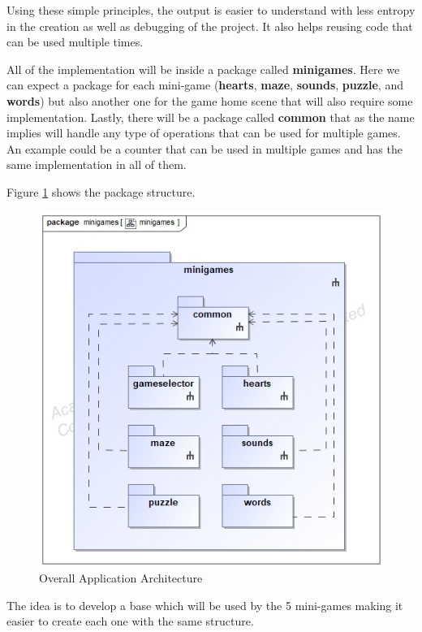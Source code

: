 Using these simple principles, the output is easier to understand with less entropy in the creation as well as debugging of the project. It also helps reusing code that can be used multiple times.

All of the implementation will be inside a package called \textbf{minigames}. Here we can expect a package for each mini-game (\textbf{hearts}, \textbf{maze}, \textbf{sounds}, \textbf{puzzle}, and \textbf{words}) but also another one for the game home scene that will also require some implementation. Lastly, there will be a package called \textbf{common} that as the name implies will handle any type of operations that can be used for multiple games. An example could be a counter that can be used in multiple games and has the same implementation in all of them.


\newpage
Figure \ref{fig:packages} shows the package structure.

\begin{figure}[H]
    \centering
    \includegraphics[scale=.5]{Chapters/arq/class__minigames__minigames.jpg}
    \caption{Overall Application Architecture}
    \label{fig:packages}
\end{figure}

The idea is to develop a base which will be used by the 5 mini-games making it easier to create each one with the same structure. 


